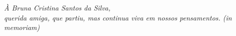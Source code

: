 \begin{dedicatoria}
   \vspace*{\fill}
   \centering
   \noindent
   \textit{ À Bruna Cristina Santos da Silva,\\
   querida amiga, que partiu, mas continua viva em nossos pensamentos. (in memoriam)} 

   
   \vspace*{\fill}
   

\end{dedicatoria}
